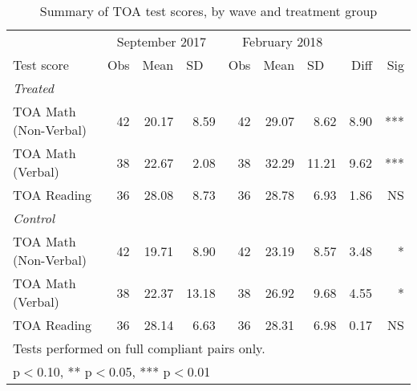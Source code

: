 \begin{table}[htbp]
  \centering
  \caption{Summary of TOA test scores, by wave and treatment group}
    \begin{tabular}{lrrrrrrrr}
    \toprule
          & \multicolumn{3}{c}{September 2017} & \multicolumn{3}{c}{February 2018} &       & \\\cmidrule(lr){2-4}\cmidrule(lr){5-7}
    Test score & \multicolumn{1}{l}{Obs} & \multicolumn{1}{l}{Mean} & \multicolumn{1}{l}{SD} & \multicolumn{1}{l}{Obs} & \multicolumn{1}{l}{Mean} & \multicolumn{1}{l}{SD} & Diff & Sig \\
    \midrule
    \multicolumn{1}{l}{\textit{Treated}} &       &       &       &       &       &       &       &  \\
    TOA Math (Non-Verbal) & 42    & 20.17 & 8.59  & 42    & 29.07 & 8.62  & 8.90  & *** \\
    TOA Math (Verbal) & 38    & 22.67 & 2.08  & 38    & 32.29 & 11.21 & 9.62  & *** \\
    TOA Reading & 36    & 28.08 & 8.73  & 36    & 28.78 & 6.93  & 1.86  & NS \\
    \multicolumn{1}{l}{\textit{Control}} &       &       &       &       &       &       &       &  \\
    TOA Math (Non-Verbal) & 42    & 19.71 & 8.90  & 42    & 23.19 & 8.57  & 3.48  & * \\
    TOA Math (Verbal) & 38    & 22.37 & 13.18 & 38    & 26.92 & 9.68  & 4.55  & * \\
    TOA Reading & 36    & 28.14 & 6.63  & 36    & 28.31 & 6.98  & 0.17  & NS \\
    \bottomrule
    \multicolumn{9}{l}{\footnotesize Tests performed on full compliant pairs only.}\\
\multicolumn{9}{l}{\footnotesize * p$<$0.10, ** p$<$0.05, *** p$<$0.01}\\
    \end{tabular}%
  \label{tab:sum_by_wave_paired}%
\end{table}%
